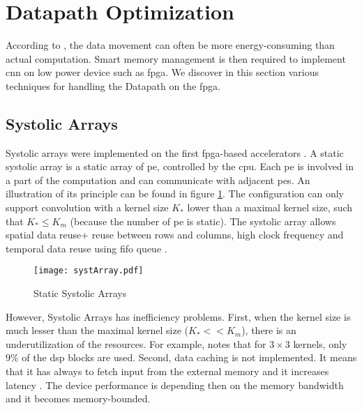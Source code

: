 \section{Datapath Optimization} \label{sec:dtptopti}
According to \textcite{chen_eyeriss_2017}, the data movement can often be more energy-consuming than actual computation. Smart memory management is then required to implement \acrshort{cnn} on low power device such as \acrshort{fpga}. We discover in this section various techniques for handling the Datapath on the \acrshort{fpga}.
%
%
\subsection{Systolic Arrays}
%
%
Systolic arrays were implemented on the first \acrshort{fpga}-based accelerators \cite{farabet_cnp_2009, gokhale_240_2014}. A static systolic array is a static array of \acrshort{pe}, controlled by the \acrshort{cpu}. Each \acrshort{pe} is involved in a part of the computation and can communicate with adjacent \acrshort{pe}s. An illustration of its principle can be found in figure \ref{fig:sytar}. The configuration can only support convolution with a kernel size $K_*$ lower than a maximal kernel size, such that $K_* \leq K_m$ (because the number of \acrshort{pe} is static). The systolic array allows spatial data reuse+ reuse between rows and columns, high clock frequency and temporal data reuse using \acrshort{fifo} queue \cite{joos_de_ter_beerst_accelerating_2019, mittal_survey_2020}.
\begin{figure}
    \centering
    \texttt{[image: systArray.pdf]}
    \caption{Static Systolic Arrays}
    \label{fig:sytar}
\end{figure} \newline \newline
However, Systolic Arrays has inefficiency problems. First, when the kernel size is much lesser than the maximal kernel size ($K_* << K_m$), there is an underutilization of the resources. For example, \cite{gokhale_240_2014} notes that for $3 \times 3$ kernels, only $9\%$ of the \acrfull{dsp} blocks are used. Second, data caching is not implemented. It means that it has always to fetch input from the external memory and it increases latency \cite{wei_automated_2017, abdelouahab_accelerating_2018}. The device performance is depending then on the memory bandwidth and it becomes memory-bounded.
%
%
